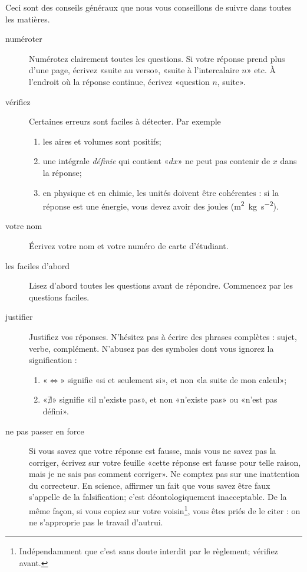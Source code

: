 Ceci sont des conseils généraux que nous vous conseillons de suivre dans toutes les matières.
\begin{description}
    \item[numéroter] Numérotez clairement toutes les questions. Si votre réponse prend plus d'une page, écrivez «suite au verso», «suite à l'intercalaire \( n\)» etc. À l'endroit où la réponse continue, écrivez «question \( n\), suite».

    \item[vérifiez] Certaines erreurs sont faciles à détecter. Par exemple
        \begin{enumerate}
            \item
                les aires et volumes sont positifs;
            \item
                une intégrale \emph{définie} qui contient «\( dx\)» ne peut pas contenir de \( x\) dans la réponse;

            \item
                en physique et en chimie, les unités doivent être cohérentes : si la réponse est une énergie, vous devez avoir des joules (\unit{\square\metre\kilo\gram\per\square\second}).

        \end{enumerate}
    \item[votre nom] Écrivez votre nom et votre numéro de carte d'étudiant.

    \item[les faciles d'abord] Lisez d'abord toutes les questions avant de répondre. Commencez par les questions faciles.

    \item[justifier] Justifiez vos réponses. N'hésitez pas à écrire des phrases complètes : sujet, verbe, complément. N'abusez pas des symboles dont vous ignorez la signification :
        \begin{enumerate}
            \item
                «\( \Leftrightarrow\)» signifie «si et seulement si», et non «la suite de mon calcul»;
            \item

                «\( \nexists\)» signifie «il n'existe pas», et non «n'existe pas» ou «n'est pas défini».
        \end{enumerate}

    \item[ne pas passer en force] Si vous savez que votre réponse est fausse, mais vous ne savez pas la corriger, écrivez sur votre feuille «cette réponse est fausse pour telle raison, mais je ne sais pas comment corriger». Ne comptez pas sur une inattention du correcteur. En science, affirmer un fait que vous savez être faux s'appelle de la falsification; c'est déontologiquement inacceptable. De la même façon, si vous copiez sur votre voisin\footnote{Indépendamment que c'est sans doute interdit par le règlement; vérifiez avant.}, vous êtes priés de le citer : on ne s'approprie pas le travail d'autrui.


\end{description}
